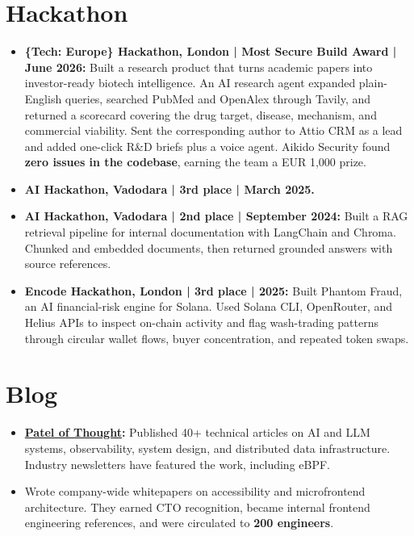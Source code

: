 \documentclass[a4paper,10pt]{article}
\begin{document}
\section{Hackathon}
\begin{itemize}
  \item \textbf{\{Tech: Europe\} Hackathon, London | Most Secure Build Award | June 2026:} Built a research product that turns academic papers into investor-ready biotech intelligence. An AI research agent expanded plain-English queries, searched PubMed and OpenAlex through Tavily, and returned a scorecard covering the drug target, disease, mechanism, and commercial viability. Sent the corresponding author to Attio CRM as a lead and added one-click R\&D briefs plus a voice agent. Aikido Security found \textbf{zero issues in the codebase}, earning the team a EUR 1,000 prize.
  \item \textbf{AI Hackathon, Vadodara | 3rd place | March 2025.}
  \item \textbf{AI Hackathon, Vadodara | 2nd place | September 2024:} Built a RAG retrieval pipeline for internal documentation with LangChain and Chroma. Chunked and embedded documents, then returned grounded answers with source references.
  \item \textbf{Encode Hackathon, London | 3rd place | 2025:} Built Phantom Fraud, an AI financial-risk engine for Solana. Used Solana CLI, OpenRouter, and Helius APIs to inspect on-chain activity and flag wash-trading patterns through circular wallet flows, buyer concentration, and repeated token swaps.
\end{itemize}

\section{Blog}
\begin{itemize}
  \item \textbf{\href{https://patelofthought.com/blog}{Patel of Thought}:} Published 40+ technical articles on AI and LLM systems, observability, system design, and distributed data infrastructure. Industry newsletters have featured the work, including eBPF.
  \item Wrote company-wide whitepapers on accessibility and microfrontend architecture. They earned CTO recognition, became internal frontend engineering references, and were circulated to \textbf{200 engineers}.
\end{itemize}
\end{document}
